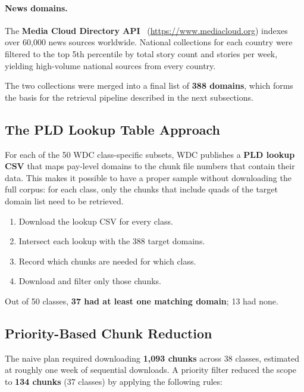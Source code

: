 \documentclass[11pt,a4paper]{article}
\begin{document}
\paragraph{News domains.}
The \textbf{Media Cloud Directory API}~\citep{mediacloud2024} (\url{https://www.mediacloud.org})
indexes over 60{,}000 news sources worldwide.  National collections for each
country were filtered to the top 5th percentile by total story count and
stories per week, yielding high-volume national sources from every country.

\vspace{1em}


The two collections were merged into a final list of \textbf{388 domains}, which forms the basis for the retrieval pipeline described in the next subsections.


\subsection{The PLD Lookup Table Approach}

For each of the 50 WDC class-specific subsets, WDC publishes a \textbf{PLD
lookup CSV} that maps pay-level domains to the chunk file numbers that contain
their data.  This makes it possible to have a proper sample without downloading the full corpus: for
each class, only the chunks that include quads of the target domain list
need to be retrieved.

\begin{enumerate}[leftmargin=1.5em]
  \item Download the lookup CSV for every class.
  \item Intersect each lookup with the 388 target domains.
  \item Record which chunks are needed for which class.
  \item Download and filter only those chunks.
\end{enumerate}


Out of 50 classes, \textbf{37 had at least one matching domain}; 13 had none.


\subsection{Priority-Based Chunk Reduction}

The naive plan required downloading \textbf{1{,}093 chunks} across 38 classes,
estimated at roughly one week of sequential downloads.  A priority filter
reduced the scope to \textbf{134 chunks} (37 classes) by applying the following
rules:
\end{document}
